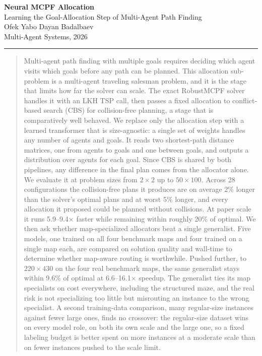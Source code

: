\documentclass[11pt,a4paper]{article}
\begin{document}
\begin{center}
{\LARGE\bfseries\color{primary} Neural MCPF Allocation}\\[4pt]
{\large Learning the Goal-Allocation Step of Multi-Agent Path Finding}\\[7pt]
{\normalsize Ofek Yabo \quad\textbar\quad Dayan Badalbaev}\\[2pt]
{\small Multi-Agent Systems, 2026}
\end{center}
\vspace{3pt}
{\color{primary}\hrule height 1.1pt}
\vspace{8pt}

\begin{abstract}
\noindent\small
Multi-agent path finding with multiple goals requires deciding which agent visits which goals
before any path can be planned. This allocation sub-problem is a multi-agent traveling salesman
problem, and it is the stage that limits how far the solver can scale. The exact RobustMCPF solver
handles it with an LKH TSP call, then passes a fixed allocation to conflict-based search (CBS) for
collision-free planning, a stage that is comparatively well behaved. We replace only the allocation
step with a learned transformer that is size-agnostic: a single set of weights handles any number of
agents and goals. It reads two shortest-path distance matrices, one from agents to goals and one
between goals, and outputs a distribution over agents for each goal. Since CBS is shared by both
pipelines, any difference in the final plan comes from the allocator alone. We evaluate it at
problem sizes from $2\times2$ up to $50\times100$. Across 28 configurations the collision-free plans
it produces are on average 2\% longer than the solver's optimal plans and at worst 5\% longer, and
every allocation it proposed could be planned without collisions. At paper scale it runs
5.9--9.4$\times$ faster while remaining within
roughly 20\% of optimal. We then ask whether map-specialized allocators beat a single generalist.
Five models, one trained on all four benchmark maps and four trained on a single map each, are
compared on solution quality and wall-time to determine whether map-aware routing is worthwhile.
Pushed further, to $220\times430$ on the four real benchmark maps, the same generalist stays within
9.6\% of optimal at 6.6--16.1$\times$ speedup. The generalist ties its map specialists on cost
everywhere, including the structured maze, and the real risk is not specializing too little but
misrouting an instance to the wrong specialist. A second training-data comparison, many
regular-size instances against fewer large ones, finds no crossover: the regular-size dataset
wins on every model role, on both its own scale and the large one, so a fixed labeling budget is
better spent on more instances at a moderate scale than on fewer instances pushed to the scale
limit.
\end{abstract}
\end{document}
